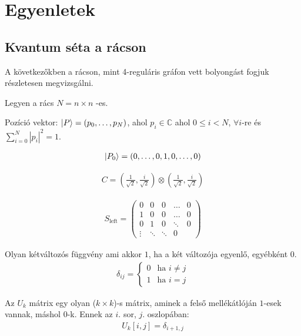 \chapter{Egyenletek}
\label{sec:Egyenletek}

\section{Kvantum séta a rácson}

A következőkben a rácson, mint 4-reguláris gráfon vett bolyongást fogjuk
részletesen megvizsgálni.

Legyen a rács $N = n \times n$ -es.

Pozíció vektor: $\ket{P} =  (p_{0}, \dots, p_{N})$, ahol
$p_{i}\in\mathds{C}$ ahol $0 \leq{} i < N$, $\forall{}i$-re és $\sum\limits_{i=0}^{N} |p_i|^2 = 1$.

\begin{align}
  \ket{P_{0}} =  (0, \dots, 0, 1, 0, \dots, 0)
\end{align}

\begin{align}
  C = (\frac{1}{\sqrt{2}}, \frac{i}{\sqrt{2}}) \otimes (\frac{1}{\sqrt{2}}, \frac{i}{\sqrt{2}})
\end{align}

\begin{align}
  S_{\text{left}} =
  \begin{pmatrix}
    0      & 0      & 0      & \dots  & 0 \\
    1      & 0      & 0      & \dots  & 0 \\
    0      & 1      & 0      & \ddots & 0 \\
    \vdots & \ddots & \ddots & 0
  \end{pmatrix}
\end{align}

\begin{definition}
  Olyan kétváltozós függvény ami akkor $1$, ha a két változója egyenlő, egyébként $0$.
  \begin{align}
    \delta_{ij} =
    \begin{cases}
      0 & \text{ha $i\neq{}j$} \\
      1 & \text{ha $i=j$}
    \end{cases}
  \end{align}
\end{definition}

\begin{definition}
  Az $U_{k}$ mátrix egy olyan ($k\times{}k$)-s mátrix, aminek a felső mellékátlóján
  $1$-esek vannak, máshol $0$-k. Ennek az $i$. sor, $j$. oszlopában:
  \begin{align}
    U_{k}[i,j] = \delta_{i+1,j}
  \end{align}
\end{definition}

